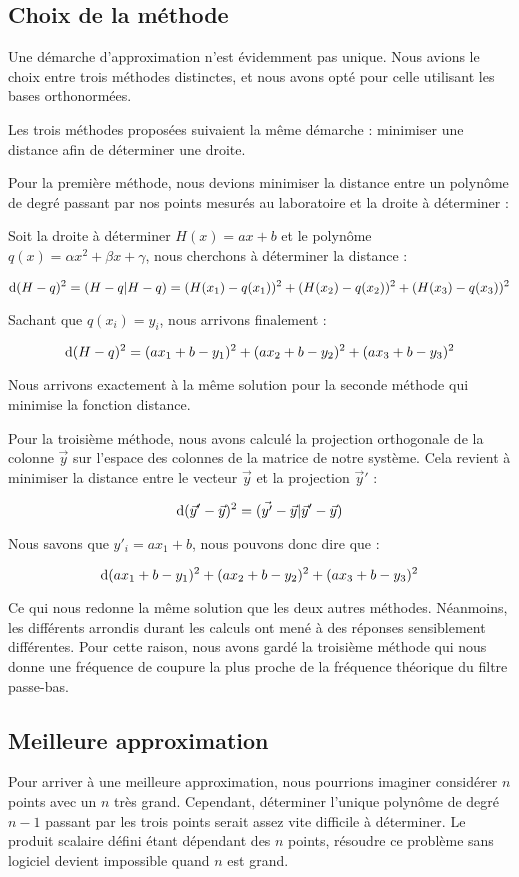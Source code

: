 \subsection{Choix de la méthode}

Une démarche d'approximation n'est évidemment pas unique. Nous avions le choix entre trois méthodes
distinctes, et nous avons opté pour celle utilisant les bases orthonormées.

Les trois méthodes proposées suivaient la même démarche : minimiser une distance afin de déterminer une droite. 

Pour la première méthode, nous devions minimiser la distance entre un polynôme de degré  passant par nos
points mesurés au laboratoire et la droite à déterminer :

Soit la droite à déterminer $H(x) = ax + b$ et le polynôme $q(x) = \alpha x^2 + \beta x + \gamma$, nous
cherchons à déterminer la distance :

$$\operatorname{d}({H-q})^2 = (H-q|H-q) = (H(x_1)-q(x_1))^2 + (H(x_2)-q(x_2))^2 + (H(x_3)-q(x_3))^2$$

Sachant que $q(x_i) = y_i$, nous arrivons finalement :

$$\operatorname{d}({H-q})^2 = (ax_1 + b - y_1)^2 + (ax_2 + b - y_2)^2 + (ax_3 + b - y_3)^2$$

Nous arrivons exactement à la même solution pour la seconde méthode qui minimise la fonction distance. 

Pour la troisième méthode, nous avons calculé la projection orthogonale de la colonne $\vec{y}$ sur l'espace
des colonnes de la matrice de notre système. Cela revient à minimiser la distance entre le vecteur $\vec{y}$ 
et la projection $\vec{y}'$ :

$$\operatorname{d}({\vec{y}'-\vec{y}})^2 = (\vec{y'}-\vec{y}|\vec{y}'-\vec{y})$$

Nous savons que $y'_i = ax_1 + b$, nous pouvons donc dire que :

$$\operatorname{d}({ax_1 + b - y_1})^2 + (ax_2 + b - y_2)^2 + (ax_3 + b - y_3)^2$$

Ce qui nous redonne la même solution que les deux autres méthodes. 
Néanmoins, les différents arrondis durant les calculs ont mené à des réponses sensiblement différentes. 
Pour cette raison, nous avons gardé la troisième méthode qui nous donne une fréquence de coupure la plus
proche de la fréquence théorique du filtre passe-bas.
 
\subsection{Meilleure approximation}
Pour arriver à une meilleure approximation, nous pourrions imaginer considérer $n$ points avec un
$n$ très grand. Cependant, déterminer l'unique polynôme de degré $n-1$ passant par les trois points 
serait assez vite difficile à déterminer. Le produit scalaire défini étant dépendant 
des $n$ points, résoudre ce problème sans logiciel devient impossible quand $n$ est grand.  

